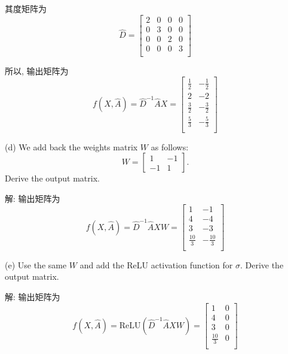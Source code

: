 \documentclass[openany]{ctexbook}
\theoremstyle{kaiti}
\theoremstyle{normal}
\begin{document}
其度矩阵为
\begin{equation}
  \hat{D}=\begin{bmatrix}
    2 & 0 & 0 & 0 \\
    0 & 3 & 0 & 0 \\
    0 & 0 & 2 & 0 \\
    0 & 0 & 0 & 3 \\
  \end{bmatrix}
\end{equation}

所以, 输出矩阵为
\begin{equation}
  f(X,\hat{A})=\hat{D}^{-1}\hat{A}X
  =\begin{bmatrix}
    \frac{1}{2} & -\frac{1}{2} \\
    2 & -2 \\
    \frac{3}{2} & -\frac{3}{2} \\
    \frac{5}{3} & -\frac{5}{3} \\
  \end{bmatrix}
\end{equation}

(d) We add back the weights matrix $W$ as follows: 
$$W =\begin{bmatrix} 1 & -1 \\ -1 & 1 \end{bmatrix}.$$
Derive the output matrix.

解: 输出矩阵为
\begin{equation}
  f(X,\hat{A})=\hat{D}^{-1}\hat{A}XW
  =\begin{bmatrix}
    1 & -1 \\
    4 & -4 \\
    3 & -3 \\
    \frac{10}{3} & -\frac{10}{3} \\
  \end{bmatrix}
\end{equation}

(e) Use the same $W$ and add the ReLU activation function for $\sigma$. Derive the output matrix.

解: 输出矩阵为
\begin{equation}
  f(X,\hat{A})=\mathrm{ReLU}\left(\hat{D}^{-1}\hat{A}XW\right)
  =\begin{bmatrix}
    1 & 0 \\
    4 & 0 \\
    3 & 0 \\
    \frac{10}{3} & 0 \\
  \end{bmatrix}
\end{equation}
\end{document}
